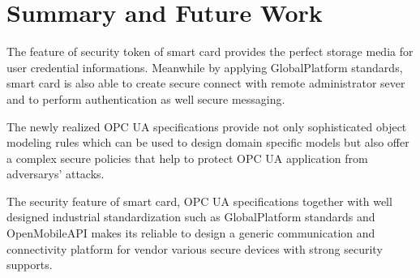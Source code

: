 \chapter{Summary and Future Work}\label{secSummary}

The feature of security token of smart card provides the perfect storage media for user credential informations. Meanwhile by applying GlobalPlatform standards, smart card is also able to create secure connect with remote administrator  sever and to perform authentication as well secure messaging. 

The newly realized OPC UA specifications provide not only sophisticated object modeling rules which can be used to design domain specific models but also offer a  complex secure policies that help to protect OPC UA application from adversarys' attacks.

The security feature of smart card, OPC UA specifications together with well designed industrial standardization such as GlobalPlatform standards and OpenMobileAPI makes its reliable to design a generic communication and connectivity platform for vendor various secure devices with strong security supports. 